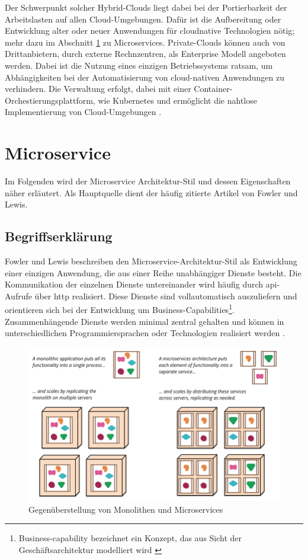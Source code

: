 Der Schwerpunkt solcher Hybrid-Clouds liegt dabei bei der Portierbarkeit der Arbeitslasten auf allen Cloud-Umgebungen.
Dafür ist die Aufbereitung oder Entwicklung alter oder neuer Anwendungen für cloudnative Technologien nötig; mehr dazu im Abschnitt \ref{Microservice} zu Microservices.
Private-Clouds können auch von Drittanbietern, durch externe Rechnzentren, als Enterprise Modell angeboten werden. Dabei ist die Nutzung eines einzigen Betriebssystems ratsam, um Abhängigkeiten bei der Automatisierung von cloud-nativen Anwendungen zu verhindern.
Die Verwaltung erfolgt, dabei mit einer Container-Orchestierungsplattform, wie Kubernetes und ermöglicht die nahtlose Implementierung von Cloud-Umgebungen \cite{ibmHybrid}.

\section{Microservice}\label{Microservice}
Im Folgenden wird der Microservice Architektur-Stil und dessen Eigenschaften näher erläutert.
Als Hauptquelle dient der häufig zitierte Artikel \cite{FowlerMicroservice} von Fowler und Lewis.

\subsection{Begriffserklärung}
Fowler und Lewis beschreiben den Microservice-Architektur-Stil als Entwicklung einer einzigen Anwendung, die aus einer Reihe unabhängiger Dienste besteht. 
Die Kommunikation der einzelnen Dienste untereinander wird häufig durch \acs{api}-Aufrufe über \acs{http} realisiert. 
Diese Dienste sind vollautomatisch auszuliefern und orientieren sich bei der Entwicklung um Business-Capabilities\footnote{Business-capability bezeichnet ein Konzept, das aus Sicht der Geschäftsarchitektur modelliert wird \cite{MicroservicePattern}}. 
Zusammenhängende Dienste werden minimal zentral gehalten und können in unterschiedlichen Programmiersprachen oder Technologien realisiert werden \cite{FowlerMicroservice}.

\begin{figure}[!htb]
  \centering
  \includegraphics[width=0.8\columnwidth]{images/MonolithsAndMicroservices.png}
  \caption{Gegenüberstellung von Monolithen und Microservices \cite{FowlerMicroservice}}
  \label{fig:monlithmicroservice}
\end{figure}

